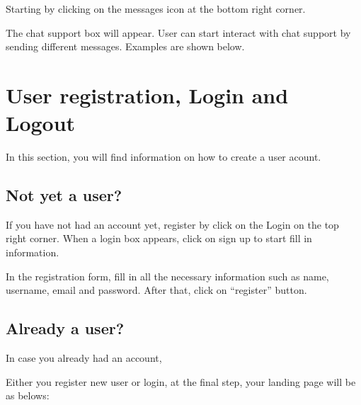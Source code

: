 \documentclass[letterpaper,10pt,english]{sphinxmanual}
\begin{document}
\sphinxAtStartPar
Starting by clicking on the messages icon at the bottom right corner.

\noindent{}

\sphinxAtStartPar
The chat support box will appear. User can start interact with chat support by sending different messages.
Examples are shown below.

\noindent{}

\noindent{}

\sphinxstepscope


\chapter{User registration, Login and Logout}
\label{\detokenize{pages/user-registration:user-registration-login-and-logout}}\label{\detokenize{pages/user-registration::doc}}
\sphinxAtStartPar
In this section, you will find information on how to create a user acount.


\section{Not yet a user?}
\label{\detokenize{pages/user-registration:not-yet-a-user}}
\sphinxAtStartPar
If you have not had an account yet, register by click on the Login on the top right corner.
When a login box appears, click on sign up to start fill in information.

\noindent{}

\sphinxAtStartPar
In the registration form, fill in all the necessary information such as name, username, email and password. After that, click on “register” button.

\noindent{}


\section{Already a user?}
\label{\detokenize{pages/user-registration:already-a-user}}
\sphinxAtStartPar
In case you already had an account,

\noindent{}

\sphinxAtStartPar
Either you register new user or login, at the final step, your landing page will be as belows:

\noindent{}
\end{document}
